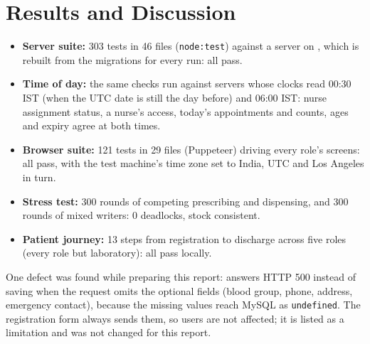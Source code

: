 \section{Results and Discussion}
\begin{itemize}
\item \textbf{Server suite:} 303 tests in 46 files (\texttt{node:test}) against a server on , which is rebuilt from the migrations for every run: all pass.
\item \textbf{Time of day:} the same checks run against servers whose clocks read 00:30 IST (when the UTC date is still the day before) and 06:00 IST: nurse assignment status, a nurse's access, today's appointments and counts, ages and expiry agree at both times.
\item \textbf{Browser suite:} 121 tests in 29 files (Puppeteer) driving every role's screens: all pass, with the test machine's time zone set to India, UTC and Los Angeles in turn.
\item \textbf{Stress test:} 300 rounds of competing prescribing and dispensing, and 300 rounds of mixed writers: 0 deadlocks, stock consistent.
\item \textbf{Patient journey:} 13 steps from registration to discharge across five roles (every role but laboratory): all pass locally.
\end{itemize}
One defect was found while preparing this report:  answers HTTP 500 instead of saving
when the request omits the optional fields (blood group, phone, address, emergency contact), because the missing
values reach MySQL as \texttt{undefined}. The registration form always sends them, so users are not affected; it is
listed as a limitation and was not changed for this report.
